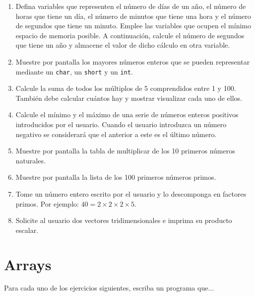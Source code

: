 \documentclass[a4paper]{article}
\newcommand{\code}[1]{\texttt{#1}}
\begin{document}
\begin{enumerate}
    \item Defina variables que representen el número de días de un año, el número de horas que tiene un día, el número de minutos que tiene una hora y el número de segundos que tiene un minuto. Emplee las variables que ocupen el mínimo espacio de memoria posible. A continuación, calcule el número de segundos que tiene un año y almacene el valor de dicho cálculo en otra variable.
    \item Muestre por pantalla los mayores números enteros que se pueden representar mediante un \code{char}, un \code{short} y un \code{int}.
    \item Calcule la suma de todos los múltiplos de 5 comprendidos entre 1 y 100. También debe calcular cuántos hay y mostrar visualizar cada uno de ellos.
    \item Calcule el mínimo y el máximo de una serie de números enteros positivos introducidos por el usuario. Cuando el usuario introduzca un número negativo se considerará que el anterior a este es el último número.
    \item Muestre por pantalla la tabla de multiplicar de los 10 primeros números naturales.
    \item Muestre por pantalla la lista de los 100 primeros números primos.
    \item Tome un número entero escrito por el usuario y lo descomponga en factores primos. Por ejemplo: $40 = 2 \times 2 \times 2 \times 5$.
    \item Solicite al usuario dos vectores tridimensionales e imprima su producto escalar.
\end{enumerate}

\section{Arrays}
\label{sec:arrays}

Para cada uno de los ejercicios siguientes, escriba un programa que...
\end{document}
